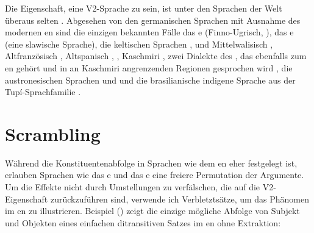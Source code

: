 Die Eigenschaft, eine V2-Sprache zu sein, ist unter den Sprachen der Welt überaus selten \citep[]{Holmberg2015a}. Abgesehen von den germanischen Sprachen mit Ausnahme des
modernen en \citep{HP86a-ed} sind die einzigen bekannten Fälle das e (Finno-Ugrisch, \citealp[]{Holmberg2015a}), das e \citep[Eintrag~79]{Plank2003b-ed} (eine slawische Sprache), die
keltischen Sprachen  \citep{BK2000a-u},  \citep*[]{BTW2007a-u} und
Mittelwalisisch \citep{Willis1998a-u}, Altfranzösisch \parencites[Abschnitt~1.3]{Adams1987a-u}[Abschnitt~2.1.2]{Roberts93a-u}[Kapitel~2]{Vance97a-u}, Altspanisch
\citep[Abschnitt~3.3.2]{Fontana97a-u},
 \citep{Poletto2002a-u,Anderson2006a-u}, Kaschmiri
\citep[Kapitel~4]{Bhatt99a-u}, zwei Dialekte des , das ebenfalls zum en gehört
und in an Kaschmiri angrenzenden Regionen gesprochen wird \citep{Hendriksen90a}, die austronesischen
Sprachen  und  \citep[]{Ross2004a-u} und die brasilianische indigene
Sprache  aus der Tupí-Sprachfamilie \citep{Storto2003a-u}.

\section{Scrambling}
\label{sec-phenomenon-scrambling}

Während die Konstituentenabfolge in Sprachen wie dem en eher festgelegt ist, erlauben Sprachen wie das e und
das e eine freiere Permutation der Argumente. Um die Effekte nicht durch
Umstellungen zu verfälschen, die auf die V2-Eigenschaft zurückzuführen sind, verwende ich Verbletztsätze, um das
Phänomen im en zu illustrieren. Beispiel () zeigt die einzige mögliche Abfolge von Subjekt und Objekten eines einfachen
ditransitiven Satzes im en ohne Extraktion:

